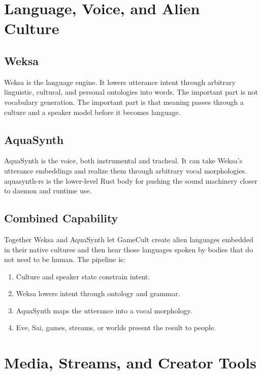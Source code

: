 \documentclass[11pt,oneside]{article}
\begin{document}
\section{Language, Voice, and Alien Culture}

\subsection{Weksa}

Weksa is the language engine. It lowers utterance intent through arbitrary
linguistic, cultural, and personal ontologies into words. The important part is
not vocabulary generation. The important part is that meaning passes through a
culture and a speaker model before it becomes language.

\subsection{AquaSynth}

AquaSynth is the voice, both instrumental and tracheal. It can take Weksa's
utterance embeddings and realize them through arbitrary vocal morphologies.
aquasynth-rs is the lower-level Rust body for pushing the sound machinery closer
to daemon and runtime use.

\subsection{Combined Capability}

Together Weksa and AquaSynth let GameCult create alien languages embedded in
their native cultures and then hear those languages spoken by bodies that do
not need to be human. The pipeline is:

\begin{enumerate}
  \item Culture and speaker state constrain intent.
  \item Weksa lowers intent through ontology and grammar.
  \item AquaSynth maps the utterance into a vocal morphology.
  \item Eve, Sai, games, streams, or worlds present the result to people.
\end{enumerate}

\section{Media, Streams, and Creator Tools}
\end{document}
